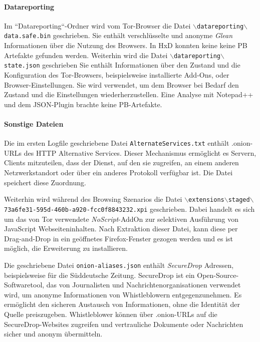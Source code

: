 \begin{appendices}
{\begin{landscape}
\begin{table}[h!]
{\begin{tabular}{cllll}
						\end{tabular}
					}
				\end{table}
			\end{landscape}
		}
		\restoregeometry
		
		
		\paragraph*{Datareporting}
		Im ``Datareporting``-Ordner wird vom Tor-Browser die Datei \texttt{$\backslash$datareporting$\backslash$\\data.safe.bin} geschrieben. Sie enthält verschlüsselte und anonyme \textit{Glean} Informationen über die Nutzung des Browsers. \cite{GitHub.05.06.2023b}
		In HxD konnten keine keine PB Artefakte gefunden werden.
		Weiterhin wird die Datei \texttt{$\backslash$datareporting$\backslash$state.json} geschrieben
		Sie enthält Informationen über den Zustand und die Konfiguration des Tor-Browsers, beispielsweise installierte Add-Ons, oder Browser-Einstellungen. Sie wird verwendet, um dem Browser bei Bedarf den Zustand und die Einstellungen wiederherzustellen. \cite{GitHub.08.04.2019}
		Eine Analyse mit Notepad++ und dem JSON-Plugin brachte keine PB-Artefakte.
		
		\paragraph*{Sonstige Dateien}
		Die im ersten Logfile geschriebene Datei \texttt{AlternateServices.txt}
		enthält .onion-URLs des HTTP Alternative Services. Dieser Mechanismus ermöglicht es Servern, Clients mitzuteilen, dass der Dienst, auf den sie zugreifen, an einem anderen Netzwerkstandort oder über ein anderes Protokoll verfügbar ist. Die Datei speichert diese Zuordnung. \cite{MozillaSupport.26.10.2020}
		
		Weiterhin wird während des Browsing Szenarios die Datei \texttt{$\backslash$extensions$\backslash$staged$\backslash${73a6fe31-595d-460b-a920-fcc0f8843232}.xpi} geschrieben. Dabei handelt es sich um das von Tor verwendete \textit{NoScript}-AddOn zur selektiven Ausführung von JavaScript Webseiteninhalten.
		Nach Extraktion dieser Datei, kann diese per Drag-and-Drop in ein geöffnetes Firefox-Fenster gezogen werden und es ist möglich, die Erweiterung zu installieren.
		
		Die geschriebene Datei \texttt{onion-aliases.json} enthält \textit{SecureDrop} Adressen, beispielsweise für die Süddeutsche Zeitung. 
		SecureDrop ist ein Open-Source-Softwaretool, das von Journalisten und Nachrichtenorganisationen verwendet wird, um anonyme Informationen von Whistleblowern entgegenzunehmen. Es ermöglicht den sicheren Austausch von Informationen, ohne die Identität der Quelle preiszugeben. Whistleblower können über .onion-URLs auf die SecureDrop-Websites zugreifen und vertrauliche Dokumente oder Nachrichten sicher und anonym übermitteln. \cite{SecureDrop.05.06.2023}
		

\end{appendices}
